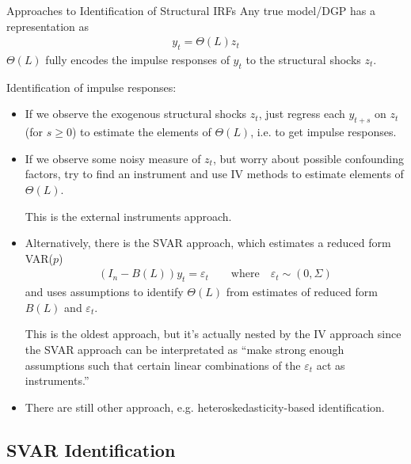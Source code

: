 \documentclass[aspectratio=169, handout]{beamer}
\begin{document}
{\scriptsize
\begin{frame}{Approaches to Identification of Structural IRFs}
Any true model/DGP has a representation as
\begin{align*}
  y_t=\Theta(L)z_t
\end{align*}
$\Theta(L)$ fully encodes the impulse responses of $y_t$ to the
structural shocks $z_t$.

Identification of impulse responses:
\begin{itemize}
  \item If we \alert{observe} the exogenous structural shocks $z_t$,
    just regress each $y_{t+s}$ on $z_t$ (for $s\geq 0$) to estimate the
    elements of $\Theta(L)$, i.e.  to get impulse responses.

  \item If we observe some \alert{noisy measure} of $z_t$, but worry
    about possible confounding factors, try to find an instrument and
    use IV methods to estimate elements of $\Theta(L)$.

    This is the \alert{external instruments} approach.

  \item Alternatively, there is the \alert{SVAR approach},
    which estimates a reduced form VAR($p$)
    \begin{align*}
      (I_n-B(L))y_t = \varepsilon_t
      \qquad\text{where}\quad
      \varepsilon_t
      \sim (0,\Sigma)
    \end{align*}
    and uses assumptions to identify $\Theta(L)$ from
    estimates of reduced form $B(L)$ and $\varepsilon_t$.

    This is the oldest approach, but it's actually nested by the IV
    approach since the SVAR approach can be interpretated as ``make
    strong enough assumptions such that certain linear combinations of
    the $\varepsilon_t$ act as instruments.''

  \item There are still other approach, e.g. heteroskedasticity-based
    identification.

\end{itemize}
\end{frame}
}

\subsection{SVAR Identification}
\end{document}
